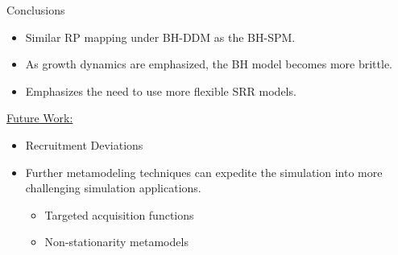 \documentclass[ xcolor = pdftex, dvipsnames, table ]{beamer}
\begin{document}
%
\begin{frame}{Conclusions}
\begin{itemize}
\setlength\itemsep{1em}
\item Similar RP mapping under BH-DDM as the BH-SPM. 
\item As growth dynamics are emphasized, the BH model becomes more brittle.
\item Emphasizes the need to use more flexible SRR models. 
\end{itemize}
\underline{Future Work:}
\begin{itemize}
	\setlength\itemsep{1em}	
	\item Recruitment Deviations
	\item Further metamodeling techniques can expedite the simulation 
		into more challenging simulation applications.
	\begin{itemize}
		\item Targeted acquisition functions 
		\item Non-stationarity metamodels
	\end{itemize}
\end{itemize}
\end{frame}
\end{document}
